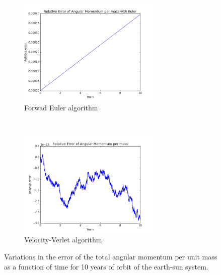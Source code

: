 \documentclass[a4paper, 10pt]{article}
\begin{document}
\begin{figure}[!ht]
    \centering
    \begin{subfigure}[H!]{0.5\textwidth}
        \centering
        \includegraphics[height=2.0in]{relErrMomESEuler.png}
        \caption{Forwad Euler algorithm}
    \end{subfigure}%
    ~ 
    \begin{subfigure}[H!]{0.5\textwidth}
        \centering
        \includegraphics[height=2.0in]{relErMomES.png}
        \caption{Velocity-Verlet algorithm}
    \end{subfigure}
    \caption{Variations in the error of the total angular momentum per unit mass as a function of time for 10 years of orbit of the earth-sun system. }
\end{figure}
\newpage
\end{document}
